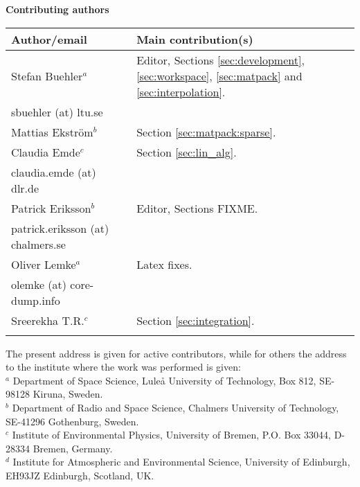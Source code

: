 \documentclass[11pt,twoside,a4paper,fleqn]{book}
\begin{document}
%
\newpage
\thispagestyle{plain}
%
\begin{center}
  {\Large \bf Contributing authors}
\end{center}
\vspace*{10mm}
\begin{tabular}{lp{10mm}l}
  \hline
  {\bf Author/email} & & {\bf Main contribution(s)} \\
  \hline
  Stefan Buehler$^a$ & & Editor, Sections \ref{sec:development}, \ref{sec:workspace},
  \ref{sec:matpack} and \ref{sec:interpolation}.\\
  sbuehler (at) ltu.se & &        \\
 \hline
  Mattias Ekstr\"om$^b$ & & Section \ref{sec:matpack:sparse}. \\
  \hline
  Claudia Emde$^c$ & & Section \ref{sec:lin_alg}.\\
  claudia.emde (at) dlr.de & & \\
  \hline
  Patrick Eriksson$^b$ &  & Editor, Sections FIXME. \\
  patrick.eriksson (at) chalmers.se & & \\
  \hline
  Oliver Lemke$^a$ & & Latex fixes.\\
  olemke (at) core-dump.info & & \\
 \hline
  Sreerekha T.R.$^c$ & & Section \ref{sec:integration}.\\
  \hline
  &&\\
\end{tabular}

\noindent
The present address is given for active contributors, while for others
the address to the institute where the work was performed is given:\\
$^a$ Department of Space Science, Lule{\aa} University of Technology, 
Box 812, SE-98128 Kiruna, Sweden. \\
$^b$ Department of Radio and Space Science, Chalmers University of Technology,
SE-41296 Gothenburg, Sweden. \\
$^c$ Institute of Environmental Physics, University of Bremen, P.O. Box 33044, 
D-28334 Bremen, Germany. \\
$^d$ Institute for Atmospheric and Environmental Science, University of 
Edinburgh, EH93JZ Edinburgh, Scotland, UK. \\


%
\newpage
\thispagestyle{empty}
\rule{0pt}{10pt}
\newpage
\end{document}

